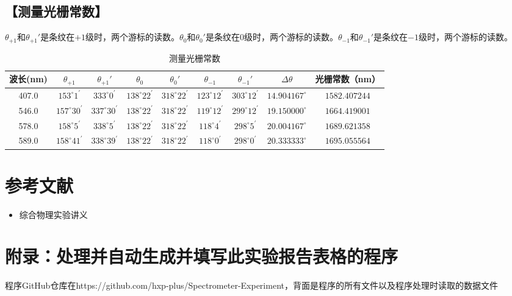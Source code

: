 \documentclass{ctexart}
\let\oldsubsection\subsection
\renewcommand{\subsection}[1]{\oldsubsection{\!\!\!\!\!\!【#1】}}
\begin{document}
\subsection{测量光栅常数}

$\theta_{+1}$和$\theta_{+1}'$是条纹在$+1$级时，两个游标的读数。$\theta_0$和$\theta_0'$是条纹在$0$级时，两个游标的读数。$\theta_{-1}$和$\theta_{-1}'$是条纹在$-1$级时，两个游标的读数。

\begin{table}[H]
  \centering
  \begin{tabular}{|c|c|c|c|c|c|c|c|c|}
    \hline
     波长(nm) &  $\theta_{+1}$ & $\theta_{+1}'$ & $\theta_0$ & $\theta_0'$ & $\theta_{-1}$ & $\theta_{-1}'$ & $\Delta \theta$ & 光栅常数（nm）\\\hline
    407.0&$153^\circ1^\prime$ &$333^\circ0^\prime$ &$138^\circ22^\prime$ &$318^\circ22^\prime$ &$123^\circ12^\prime$ &$303^\circ12^\prime$ &$14.904167^\circ$ &$1582.407244$\\\hline
    546.0&$157^\circ30^\prime$ &$337^\circ30^\prime$ &$138^\circ22^\prime$ &$318^\circ22^\prime$ &$119^\circ12^\prime$ &$299^\circ12^\prime$ &$19.150000^\circ$ &$1664.419001$\\\hline
    578.0&$158^\circ5^\prime$ &$338^\circ5^\prime$ &$138^\circ22^\prime$ &$318^\circ22^\prime$ &$118^\circ4^\prime$ &$298^\circ5^\prime$ &$20.004167^\circ$ &$1689.621358$\\\hline
    589.0&$158^\circ41^\prime$ &$338^\circ39^\prime$ &$138^\circ22^\prime$ &$318^\circ22^\prime$ &$118^\circ0^\prime$ &$298^\circ0^\prime$ &$20.333333^\circ$ &$1695.055564$\\\hline
  \end{tabular}
  \caption{测量光栅常数}
\end{table}

\section{参考文献}

\begin{itemize}[leftmargin=0pt]
\item[] 综合物理实验讲义
\end{itemize}

\section{附录：处理并自动生成并填写此实验报告表格的程序}

程序GitHub仓库在https://github.com/hxp-plus/Spectrometer-Experiment，背面是程序的所有文件以及程序处理时读取的数据文件




\end{document}
